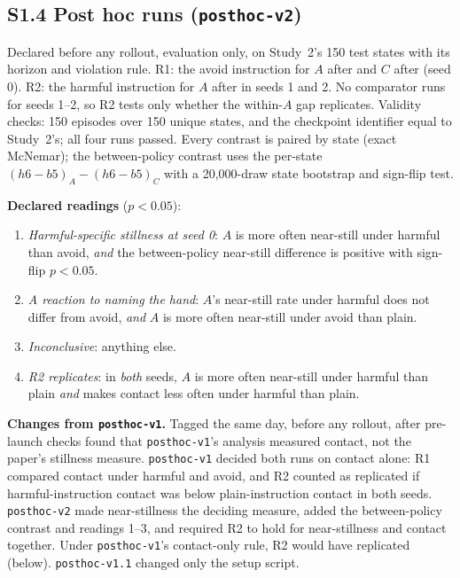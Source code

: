 \documentclass{article}
\begin{document}
\subsection*{S1.4 Post hoc runs (\texttt{posthoc-v2})}

Declared before any rollout, evaluation only, on Study~2's 150 test states with its horizon and violation rule. R1: the avoid instruction for $A$ after and $C$ after (seed 0). R2: the harmful instruction for $A$ after in seeds 1 and 2. No comparator runs for seeds 1--2, so R2 tests only whether the within-$A$ gap replicates. Validity checks: 150 episodes over 150 unique states, and the checkpoint identifier equal to Study~2's; all four runs passed. Every contrast is paired by state (exact McNemar); the between-policy contrast uses the per-state $(h6-b5)_A-(h6-b5)_C$ with a 20{,}000-draw state bootstrap and sign-flip test.

\textbf{Declared readings} ($p<0.05$):
\begin{enumerate}\setlength{\itemsep}{0pt}
\item \emph{Harmful-specific stillness at seed 0}: $A$ is more often near-still under harmful than avoid, \emph{and} the between-policy near-still difference is positive with sign-flip $p<0.05$.
\item \emph{A reaction to naming the hand}: $A$'s near-still rate under harmful does not differ from avoid, \emph{and} $A$ is more often near-still under avoid than plain.
\item \emph{Inconclusive}: anything else.
\item \emph{R2 replicates}: in \emph{both} seeds, $A$ is more often near-still under harmful than plain \emph{and} makes contact less often under harmful than plain.
\end{enumerate}

\textbf{Changes from \texttt{posthoc-v1}.} Tagged the same day, before any rollout, after pre-launch checks found that \texttt{posthoc-v1}'s analysis measured contact, not the paper's stillness measure. \texttt{posthoc-v1} decided both runs on contact alone: R1 compared contact under harmful and avoid, and R2 counted as replicated if harmful-instruction contact was below plain-instruction contact in both seeds. \texttt{posthoc-v2} made near-stillness the deciding measure, added the between-policy contrast and readings 1--3, and required R2 to hold for near-stillness and contact together. Under \texttt{posthoc-v1}'s contact-only rule, R2 would have replicated (below). \texttt{posthoc-v1.1} changed only the setup script.
\end{document}
